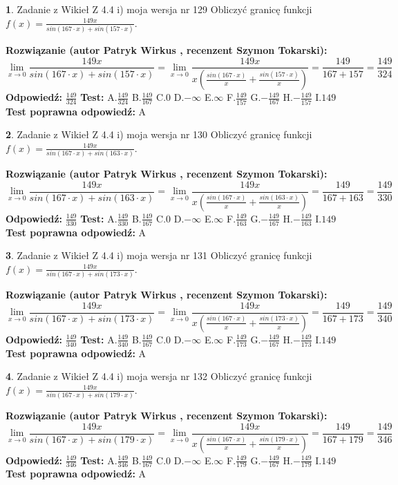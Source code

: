 \documentclass[12pt, a4paper]{article}
\theoremstyle{definition} %
\newtheorem{zad}{}
\newcommand{\zadStart}[1]{\begin{zad}#1\newline}
\newcommand{\zadStop}{\end{zad}}
\newcommand{\rozwStart}[2]{\noindent \textbf{Rozwiązanie (autor #1 , recenzent #2): }\newline}
\newcommand{\rozwStop}{\newline}
\newcommand{\odpStart}{\noindent \textbf{Odpowiedź:}\newline}
\newcommand{\odpStop}{\newline}
\newcommand{\testStart}{\noindent \textbf{Test:}\newline}
\newcommand{\testStop}{\newline}
\newcommand{\kluczStart}{\noindent \textbf{Test poprawna odpowiedź:}\newline}
\newcommand{\kluczStop}{\newline}
\begin{document}
\zadStart{Zadanie z Wikieł Z 4.4 i) moja wersja nr 129}
Obliczyć granicę funkcji $f(x)=\frac{149x}{sin(167\cdot x) +sin(157\cdot x)}$.
\zadStop
\rozwStart{Patryk Wirkus}{Szymon Tokarski}
$$\lim\limits_{x\to 0}\frac{149x}{sin(167\cdot x) +sin(157\cdot x)}=\lim\limits_{x\to 0}\frac{149x}{x(\frac{sin(167\cdot x)}{x}+\frac{sin(157\cdot x)}{x})}=\frac{149}{167+157} = \frac{149}{324}$$
\rozwStop
\odpStart
$\frac{149}{324}$
\odpStop
\testStart
A.$\frac{149}{324}$
B.$\frac{149}{167}$
C.$0$
D.$-\infty$
E.$\infty$
F.$\frac{149}{157}$
G.$-\frac{149}{167}$
H.$-\frac{149}{157}$
I.$149$
\testStop
\kluczStart
A
\kluczStop



\zadStart{Zadanie z Wikieł Z 4.4 i) moja wersja nr 130}
Obliczyć granicę funkcji $f(x)=\frac{149x}{sin(167\cdot x) +sin(163\cdot x)}$.
\zadStop
\rozwStart{Patryk Wirkus}{Szymon Tokarski}
$$\lim\limits_{x\to 0}\frac{149x}{sin(167\cdot x) +sin(163\cdot x)}=\lim\limits_{x\to 0}\frac{149x}{x(\frac{sin(167\cdot x)}{x}+\frac{sin(163\cdot x)}{x})}=\frac{149}{167+163} = \frac{149}{330}$$
\rozwStop
\odpStart
$\frac{149}{330}$
\odpStop
\testStart
A.$\frac{149}{330}$
B.$\frac{149}{167}$
C.$0$
D.$-\infty$
E.$\infty$
F.$\frac{149}{163}$
G.$-\frac{149}{167}$
H.$-\frac{149}{163}$
I.$149$
\testStop
\kluczStart
A
\kluczStop



\zadStart{Zadanie z Wikieł Z 4.4 i) moja wersja nr 131}
Obliczyć granicę funkcji $f(x)=\frac{149x}{sin(167\cdot x) +sin(173\cdot x)}$.
\zadStop
\rozwStart{Patryk Wirkus}{Szymon Tokarski}
$$\lim\limits_{x\to 0}\frac{149x}{sin(167\cdot x) +sin(173\cdot x)}=\lim\limits_{x\to 0}\frac{149x}{x(\frac{sin(167\cdot x)}{x}+\frac{sin(173\cdot x)}{x})}=\frac{149}{167+173} = \frac{149}{340}$$
\rozwStop
\odpStart
$\frac{149}{340}$
\odpStop
\testStart
A.$\frac{149}{340}$
B.$\frac{149}{167}$
C.$0$
D.$-\infty$
E.$\infty$
F.$\frac{149}{173}$
G.$-\frac{149}{167}$
H.$-\frac{149}{173}$
I.$149$
\testStop
\kluczStart
A
\kluczStop



\zadStart{Zadanie z Wikieł Z 4.4 i) moja wersja nr 132}
Obliczyć granicę funkcji $f(x)=\frac{149x}{sin(167\cdot x) +sin(179\cdot x)}$.
\zadStop
\rozwStart{Patryk Wirkus}{Szymon Tokarski}
$$\lim\limits_{x\to 0}\frac{149x}{sin(167\cdot x) +sin(179\cdot x)}=\lim\limits_{x\to 0}\frac{149x}{x(\frac{sin(167\cdot x)}{x}+\frac{sin(179\cdot x)}{x})}=\frac{149}{167+179} = \frac{149}{346}$$
\rozwStop
\odpStart
$\frac{149}{346}$
\odpStop
\testStart
A.$\frac{149}{346}$
B.$\frac{149}{167}$
C.$0$
D.$-\infty$
E.$\infty$
F.$\frac{149}{179}$
G.$-\frac{149}{167}$
H.$-\frac{149}{179}$
I.$149$
\testStop
\kluczStart
A
\kluczStop
\end{document}
